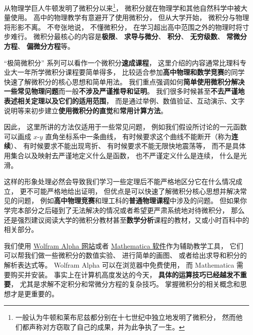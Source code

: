 
\begin{issues}
\issueDraft
\end{issues}

从物理学巨人牛顿发明了微积分以来\footnote{一般认为牛顿和莱布尼兹都分别在十七世纪中独立地发明了微积分， 然而他们都声称对方窃取了自己的成果，并为此争执了一生。}， 微积分就在物理学和其他自然科学中被大量使用。 高中的物理教学有意避开了使用微积分， 但从大学开始， 微积分与物理将形影不离。 不夸张地说， 不懂微积分， 在学习超出高中范围之外的物理时将寸步难行。 微积分最核心的内容是\textbf{极限}、 \textbf{求导与微分}、 \textbf{积分}、 \textbf{无穷级数}、 \textbf{常微分方程}、 \textbf{偏微分方程}等。

“极简微积分” 系列可以看作一个微积分\textbf{速成课程}， 这里介绍的内容通常比理科专业大一年所学微积分课程要简单得多， 比较适合参加\textbf{高中物理和数学竞赛}的同学快速了解微积分的核心思想和简单用法。 我们重点强调如何\textbf{简单使用微积分解决一些常见物理问题}而一般\textbf{不涉及严谨推导和证明}。 我们很多时候甚至\textbf{不去严谨地表述相关定理以及它们的适用范围}， 而是通过举例、数值验证、互动演示、文字说明等来初步建立\textbf{使用微积分的直觉}和\textbf{常用计算方法}。

因此， 这里所讲的方法仅适用于一些常见问题， 例如我们假设所讨论的一元函数可以画成 $x$-$y$ 直角坐标系中一条曲线， 有时候要求这个曲线不能断开（称为\textbf{连续}）、 有时候要求不能出现弯折、 有时候要求不能无限快地震荡等， 而不是具体用集合以及映射去严谨地定义什么是函数， 也不严谨定义什么是连续， 什么是光滑。

这样的形象处理必然会导致我们学习一些定理后不能严格地区分它在什么情况成立， 更不可能严格地给出证明， 但优点是可以快速了解微积分核心思想并解决常见的问题， 例如\textbf{高中物理竞赛}和理工科的\textbf{普通物理课程}中涉及的问题。 但如果你学完本部分之后碰到了无法解决的情况或者希望更严肃系统地对待微积分， 那么还是强烈建议阅读大学的微积分教材甚至\textbf{数学分析}课程的教材，又或小时百科中的相关部分。

我们使用 \href{https://www.wolframalpha.com/}{Wolfram Alpha 网站}或者 \href{https://www.wolfram.com/mathematica/}{Mathematica 软件}作为辅助教学工具， 它们可以帮我们做一些微积分的数值实验、 进行简单的画图、 或者给出求导和积分的解析表达式等。 Wolfram Alpha 可以在浏览器中免费使用， 而 Mathematica 需要购买并安装。 事实上在计算机高度发达的今天， \textbf{具体的运算技巧已经越发不重要}， 尤其是求解不定积分和常微分方程的复杂技巧。 掌握微积分的相关概念和思想才是更重要的。

